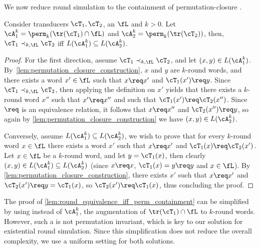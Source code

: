 We now reduce round simulation to the containment of permutation-closure \NFAs.

\begin{lemma}
\label{lem:round_equivalence_iff_perm_containment}
	Consider transducers $\cT_1,\cT_2$, an \NFA $\fL$ and $k>0$. Let $\cA_1^k=\perm_k(\tr(\cT_1)\cap\fL)$ and $\cA_2^k=\perm_k(\tr(\cT_2))$,
	then, $\cT_1\prec_{k,\fL} \cT_2$ iff $L(\cA^k_1)\subseteq L(\cA^k_2)$.
\end{lemma}
\begin{proof}
	For the first direction, assume $\cT_1\prec_{k,\fL} \cT_2$, and let $(x,y)\in L(\cA^k_1)$. By~\cref{lem:permutation_closure_construction}, $x$ and $y$ are $k$-round words, and there exists a word $x'\in \fL$ such that $x\req x'$ and $\cT_1(x')\req y$. Since $\cT_1\prec_{k,\fL} \cT_2$, then applying the definition on $x'$ yields that there exists a $k$-round word $x''$ such that $x'\req x''$ and such that $\cT_1(x')\req \cT_2(x'')$. Since $\req$ is an equivalence relation, it follows that $x\req x''$ and $\cT_2(x'')\req y$, so again by \cref{lem:permutation_closure_construction} we have $(x,y)\in L(\cA^k_2)$.
	
	Conversely, assume $L(\cA^k_1)\subseteq L(\cA^k_2)$, we wish to prove that for every $k$-round word $x\in \fL$ there exists a word $x'$ such that $x\req x'$ and $\cT_1(x)\req \cT_2(x')$. Let $x\in \fL$ be a $k$-round word, and let $y=\cT_1(x)$, then clearly $(x,y)\in L(\cA^k_1)\subseteq L(\cA^k_2)$ (since $x\req x$, $\cT_1(x)=y\req y$ and $x\in \fL$). By \cref{lem:permutation_closure_construction}, there exists $x'$ such that $x\req x'$ and $\cT_2(x')\req y=\cT_1(x)$, so $\cT_2(x')\req \cT_1(x)$, thus concluding the proof.
\end{proof}

\begin{remark}
\label{rmk:det_A1}
The proof of \cref{lem:round_equivalence_iff_perm_containment} can be simplified by using instead of $\cA^k_1$, the augmentation of $\tr(\cT_1)\cap \fL$ to $k$-round words. However, such a \DFA is not permutation invariant, which is key to our solution for existential round simulation. Since this simplification does not reduce the overall complexity, we use a uniform setting for both solutions.
\end{remark}

